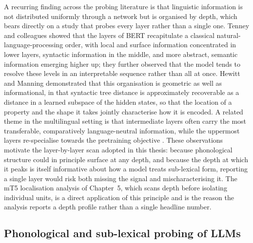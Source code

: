 A recurring finding across the probing literature is that linguistic information is not distributed uniformly through a network but is organised by depth, which bears directly on a study that probes every layer rather than a single one. Tenney and colleagues \cite{tenney2019bert} showed that the layers of BERT recapitulate a classical natural-language-processing order, with local and surface information concentrated in lower layers, syntactic information in the middle, and more abstract, semantic information emerging higher up; they further observed that the model tends to resolve these levels in an interpretable sequence rather than all at once. Hewitt and Manning \cite{hewitt2019structural} demonstrated that this organisation is geometric as well as informational, in that syntactic tree distance is approximately recoverable as a distance in a learned subspace of the hidden states, so that the location of a property and the shape it takes jointly characterise how it is encoded. A related theme in the multilingual setting is that intermediate layers often carry the most transferable, comparatively language-neutral information, while the uppermost layers re-specialise towards the pretraining objective \cite{k2020crosslingual}. These observations motivate the layer-by-layer scan adopted in this thesis: because phonological structure could in principle surface at any depth, and because the depth at which it peaks is itself informative about how a model treats sub-lexical form, reporting a single layer would risk both missing the signal and mischaracterising it. The mT5 localisation analysis of Chapter~5, which scans depth before isolating individual units, is a direct application of this principle and is the reason the analysis reports a depth profile rather than a single headline number.

\subsection{Phonological and sub-lexical probing of LLMs}


